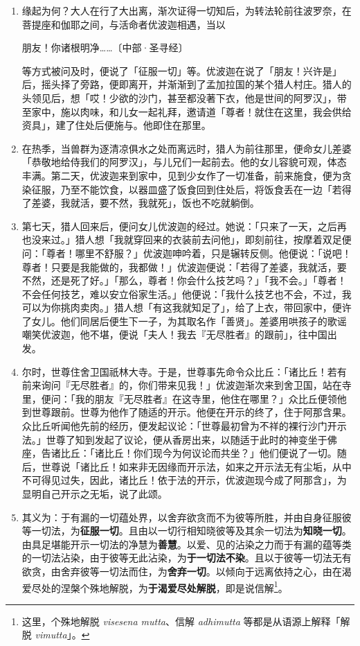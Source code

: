 \begin{enumerate}\item 缘起为何？大人在行了大出离，渐次证得一切知后，为转法轮前往波罗奈，在菩提座和伽耶之间，与活命者优波迦相遇，当以\begin{quoting}朋友！你诸根明净……{\bluefootnotesize 〔中部·圣寻经〕}\end{quoting}等方式被问及时，便说了「征服一切」等。优波迦在说了「朋友！兴许是」后，摇头择了旁路，便即离开，并渐渐到了孟加拉国的某个猎人村庄。猎人的头领见后，想「哎！少欲的沙门，甚至都没著下衣，他是世间的阿罗汉」，带至家中，施以肉味，和儿女一起礼拜，邀请道「尊者！就住在这里，我会供给资具」，建了住处后便施与。他即住在那里。
\item 在热季，当兽群为逐清凉俱水之处而离远时，猎人为前往那里，便命女儿差婆「恭敬地给侍我们的阿罗汉」，与儿兄们一起前去。他的女儿容貌可观，体态丰满。第二天，优波迦来到家中，见到少女作了一切准备，前来施食，便为贪染征服，乃至不能饮食，以器皿盛了饭食回到住处后，将饭食丢在一边「若得了差婆，我就活，要不然，我就死」，饭也不吃就躺倒。
\item 第七天，猎人回来后，便问女儿优波迦的经过。她说：「只来了一天，之后再也没来过。」猎人想「我就穿回来的衣装前去问他」，即刻前往，按摩着双足便问：「尊者！哪里不舒服？」优波迦呻吟着，只是辗转反侧。他便说：「说吧！尊者！只要是我能做的，我都做！」优波迦便说：「若得了差婆，我就活，要不然，还是死了好。」「那么，尊者！你会什么技艺吗？」「我不会。」「尊者！不会任何技艺，难以安立俗家生活。」他便说：「我什么技艺也不会，不过，我可以为你挑肉卖肉。」猎人想「有这我就知足了」，给了上衣，带回家中，便许了女儿。他们同居后便生下一子，为其取名作「善贤」。差婆用哄孩子的歌谣嘲笑优波迦，他不堪，便说「夫人！我去『无尽胜者』的跟前」，往中国出发。
\item 尔时，世尊住舍卫国祇林大寺。于是，世尊事先命令众比丘：「诸比丘！若有前来询问『无尽胜者』的，你们带来见我！」优波迦渐次来到舍卫国，站在寺里，便问：「我的朋友『无尽胜者』在这寺里，他住在哪里？」众比丘便领他到世尊跟前。世尊为他作了随适的开示。他便在开示的终了，住于阿那含果。众比丘听闻他先前的经历，便发起议论：「世尊最初曾为不祥的裸行沙门开示法。」世尊了知到发起了议论，便从香房出来，以随适于此时的神变坐于佛座，告诸比丘：「诸比丘！你们现今为何议论而共坐？」他们便说了一切。随后，世尊说「诸比丘！如来非无因缘而开示法，如来之开示法无有尘垢，从中不可得见过失，因此，诸比丘！依于法的开示，优波迦现今成了阿那含」，为显明自己开示之无垢，说了此颂。
\item 其义为：于有漏的一切蕴处界，以舍弃欲贪而不为彼等所胜，并由自身征服彼等一切法，为\textbf{征服一切}。且由以一切行相知晓彼等及其余一切法为\textbf{知晓一切}。由具足堪能开示一切法的净慧为\textbf{善慧}。以爱、见的沾染之力而于有漏的蕴等类的一切法沾染，由于彼等无此沾染，为\textbf{于一切法不染}。且以于彼等一切法无有欲贪，由舍弃彼等一切法而住，为\textbf{舍弃一切}。以倾向于远离依持之心，由在渴爱尽处的涅槃个殊地解脱，为\textbf{于渴爱尽处解脱}，即是说信解\footnote{这里，个殊地解脱 \textit{visesena mutta}、信解 \textit{adhimutta} 等都是从语源上解释「解脱 \textit{vimutta}」。}。

\end{enumerate}
